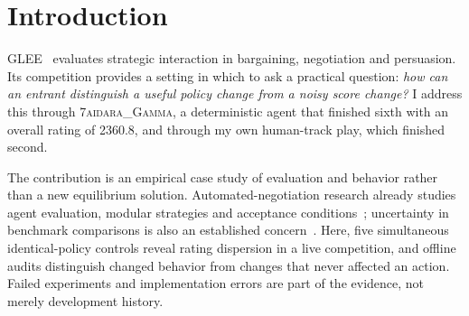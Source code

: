 \begin{abstract}
I study the difficulty of evaluating small strategy changes in a live economic-game
competition through a deterministic, LLM-free agent. The agent placed sixth in the
GLEE agent track; its development fleet logged 264,432 games across bargaining,
negotiation and persuasion. In a simultaneous 8.6-hour comparison, five identical
policy builds accumulated approximately 3,000 games each yet differed by as much
as 88 overall rating points and 293 within a game family. This documents substantial
leaderboard dispersion without a policy change, while leaving the contributions of
initialization, matchmaking and a changing reference pool unresolved. Decision-level
replay and terminal acceptance counterfactuals help investigate the behavior behind
these scores: some interventions changed no actions, while transcript inspection
exposed message-parser and termination-limit failures. An observational comparison
with my second-place human-track play shows different participation behavior, but
does not isolate message-understanding ability. The results motivate simultaneous
controls, explicit rating-model assumptions and behavioral audits when evaluating
small interventions during short competition windows. Code and analysis scripts
are public; full empirical reproduction depends on the underlying game records.
\end{abstract}

\section{Introduction}
GLEE~\cite{shapira2024glee} evaluates strategic interaction in bargaining,
negotiation and persuasion. Its competition provides a setting in which to ask a
practical question: \emph{how can an entrant distinguish a useful policy change
from a noisy score change?} I address this through \textsc{7aidara\_Gamma}, a
deterministic agent that finished sixth with an overall rating of 2360.8, and
through my own human-track play, which finished second.

The contribution is an empirical case study of evaluation and behavior rather
than a new equilibrium solution. Automated-negotiation research already studies
agent evaluation, modular strategies and acceptance conditions~\cite{anac2011,baarslag2014decoupling,baarslag2013acceptance};
uncertainty in benchmark comparisons is also an established concern~\cite{agarwal2021}.
Here, five simultaneous identical-policy controls reveal rating dispersion in a
live competition, and offline audits distinguish changed behavior from changes
that never affected an action. Failed experiments and implementation errors are
part of the evidence, not merely development history.

